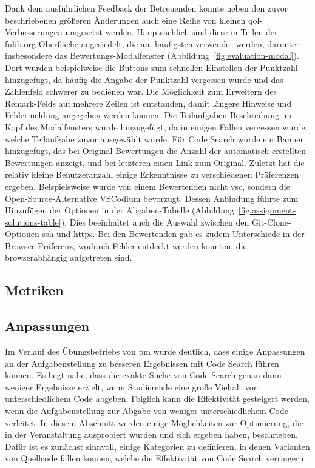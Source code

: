 Dank dem ausführlichen Feedback der Betreuenden konnte neben den zuvor beschriebenen größeren Änderungen auch eine Reihe von kleinen \ac{qol}-Verbesserungen umgesetzt werden.
Hauptsächlich sind diese in Teilen der fulib.org-Oberfläche angesiedelt, die am häufigsten verwendet werden, darunter insbesondere das Bewertungs-Modalfenster (Abbildung~\ref{fig:evaluation-modal}).
Dort wurden beispielweise die Buttons zum schnellen Einstellen der Punktzahl hinzugefügt, da häufig die Angabe der Punktzahl vergessen wurde und das Zahlenfeld schwerer zu bedienen war.
Die Möglichkeit zum Erweitern des Remark-Felds auf mehrere Zeilen ist entstanden, damit längere Hinweise und Fehlermeldung angegeben werden können.
Die Teilaufgaben-Beschreibung im Kopf des Modalfensters wurde hinzugefügt, da in einigen Fällen vergessen wurde, welche Teilaufgabe zuvor ausgewählt wurde.
Für Code Search wurde ein Banner hinzugefügt, das bei Original-Bewertungen die Anzahl der automatisch erstellten Bewertungen anzeigt, und bei letzteren einen Link zum Original.
Zuletzt hat die relativ kleine Benutzeranzahl einige Erkenntnisse zu verschiedenen Präferenzen ergeben.
Beispielsweise wurde von einem Bewertenden nicht \ac{vsc}, sondern die Open-Source-Alternative VSCodium bevorzugt.
Dessen Anbindung führte zum Hinzufügen der Optionen in der Abgaben-Tabelle (Abbildung~\ref{fig:assignment-solutions-table}).
Dies beeinhaltet auch die Auswahl zwischen den Git-Clone-Optionen \ac{ssh} und \ac{https}.
Bei den Bewertenden gab es zudem Unterschiede in der Browser-Präferenz, wodurch Fehler entdeckt werden konnten, die browserabhängig aufgetreten sind.

\subsection{Metriken}\label{subsec:pm-metrics}


\subsection{Anpassungen}\label{subsec:pm-adaptations}

Im Verlauf des Übungsbetriebs von \ac{pm} wurde deutlich, dass einige Anpassungen an der Aufgabenstellung zu besseren Ergebnissen mit Code Search führen können.
Es liegt nahe, dass die exakte Suche von Code Search genau dann weniger Ergebnisse erzielt, wenn Studierende eine große Vielfalt von unterschiedlichem Code abgeben.
Folglich kann die Effektivität gesteigert werden, wenn die Aufgabenstellung zur Abgabe von weniger unterschiedlichem Code verleitet.
In diesem Abschnitt werden einige Möglichkeiten zur Optimierung, die in der Veranstaltung ausprobiert wurden und sich ergeben haben, beschrieben.
Dafür ist es zunächst sinnvoll, einige Kategorien zu definieren, in denen Varianten von Quellcode fallen können, welche die Effektivität von Code Search verringern.

